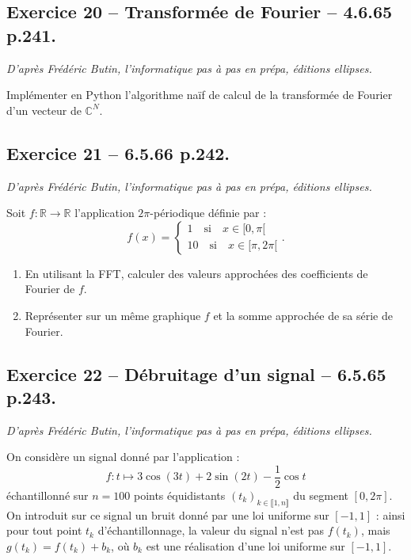 \documentclass[10pt,fleqn]{article} %
\begin{document}
\begin{multicols}{2}
\subsection*{Exercice 20 -- Transformée de Fourier -- 4.6.65 p.241.}
\begin{flushright}
\textit{D'après Frédéric Butin, l'informatique pas à pas en prépa, éditions ellipses.}
\end{flushright}
Implémenter en Python l'algorithme naïf de calcul de la transformée de Fourier d'un vecteur de $\mathbb{C}^N$.

\subsection*{Exercice 21 -- 6.5.66 p.242.}
\begin{flushright}
\textit{D'après Frédéric Butin, l'informatique pas à pas en prépa, éditions ellipses.}
\end{flushright}
Soit $f:\mathbb{R} \to \mathbb{R}$ l'application $2\pi$-périodique définie par :
$$
f(x)=\left\{
\begin{array}{l}
1  \quad \text{si} \quad x\in[0,\pi[ \\
10  \quad \text{si} \quad x\in[\pi,2\pi[
\end{array}
\right. .
$$
\begin{enumerate}
\item En utilisant la FFT, calculer des valeurs approchées des coefficients de Fourier de $f$. 
\item Représenter sur un même graphique $f$ et la somme approchée de sa série de Fourier.
\end{enumerate}

\subsection*{Exercice 22 -- Débruitage d'un signal -- 6.5.65 p.243.}
\begin{flushright}
\textit{D'après Frédéric Butin, l'informatique pas à pas en prépa, éditions ellipses.}
\end{flushright}
On considère un signal donné par l'application :
$$
f:t \mapsto 3 \cos \left( 3t\right)+2\sin \left( 2t\right)-\dfrac{1}{2}\cos t
$$
échantillonné sur $n=100$  points équidistants $(t_k)_{k\in \llbracket 1,n\rrbracket}$ du segment $[0,2\pi]$. On introduit sur ce signal un bruit donné par une loi uniforme sur $[-1,1]$ : ainsi pour tout point $t_k$ d'échantillonnage, la valeur du signal n'est pas $f(t_k)$, mais $g(t_k) = f(t_k) + b_k$, où $b_k$ est une réalisation d'une loi uniforme sur $[-1,1]$.


\end{multicols}
\end{document}
